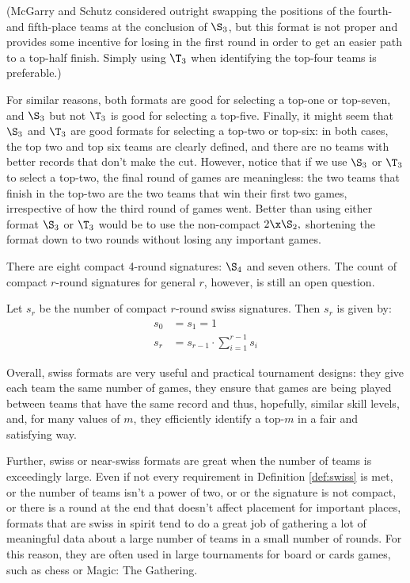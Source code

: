 {(McGarry and Schutz \cite{four_five_swap} considered outright swapping the positions of the fourth- and fifth-place teams at the conclusion of $\S_3$, but this format is not proper and provides some incentive for losing in the first round in order to get an easier path to a top-half finish. Simply using $\T_3$ when identifying the top-four teams is preferable.)

For similar reasons, both formats are good for selecting a top-one or top-seven, and $\S_3$ but not $\T_3$ is good for selecting a top-five. Finally, it might seem that $\S_3$ and $\T_3$ are good formats for selecting a top-two or top-six: in both cases, the top two and top six teams are clearly defined, and there are no teams with better records that don't make the cut. However, notice that if we use $\S_3$ or $\T_3$ to select a top-two, the final round of games are meaningless: the two teams that finish in the top-two are the two teams that win their first two games, irrespective of how the third round of games went. Better than using either format $\S_3$ or $\T_3$ would be to use the non-compact $2\x\S_2,$ shortening the format down to two rounds without losing any important games.

There are eight compact 4-round signatures: $\S_4$ and seven others. The count of compact $r$-round signatures for general $r$, however, is still an open question.


\begin{conj}{}{}
    Let $s_r$ be the number of compact $r$-round swiss signatures. Then $s_r$ is given by:
    \begin{align*}
        s_0 &= s_ 1 = 1\\
        s_r &= s_{r-1} \cdot \sum_{i=1}^{r-1}s_i
    \end{align*}
\end{conj}

Overall, swiss formats are very useful and practical tournament designs: they give each team the same number of games, they ensure that games are being played between teams that have the same record and thus, hopefully, similar skill levels, and, for many values of $m$, they efficiently identify a top-$m$ in a fair and satisfying way.

Further, swiss or near-swiss formats are great when the number of teams is exceedingly large. Even if not every requirement in Definition \ref{def:swiss} is met, or the number of teams isn't a power of two, or or the signature is not compact, or there is a round at the end that doesn't affect placement for important places, formats that are swiss in spirit tend to do a great job of gathering a lot of meaningful data about a large number of teams in a small number of rounds. For this reason, they are often used in large tournaments for board or cards games, such as chess or Magic: The Gathering. %
}